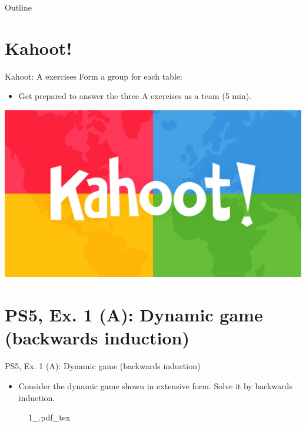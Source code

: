 

\maketitle

\begin{frame}{Outline}
    \tableofcontents
\end{frame}



\section{Kahoot!}

\begin{frame}{Kahoot: A exercises}
  Form a group for each table:
  \begin{itemize}
    \item Get prepared to answer the three A exercises as a team (5 min).
  \end{itemize}
  \includegraphics[width=\textwidth]{figures/kahoot}
\end{frame}



\section{PS5, Ex. 1 (A): Dynamic game (backwards induction)}

\begin{frame}{PS5, Ex. 1 (A): Dynamic game (backwards induction)}
  \begin{multicols}{2}
    \begin{itemize}
      \item Consider the dynamic game shown in extensive form. Solve it by backwards induction.
    \end{itemize}
    \vfill\null \columnbreak
    \begin{figure}[!h]
      \center
      \def\svgwidth{.8\columnwidth}
      {1_.pdf_tex}
    \end{figure}
    \vfill\null
  \end{multicols}
\end{frame}

